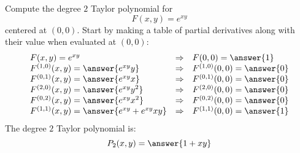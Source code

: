 \documentclass{ximera}
\author{Bart Snapp}
\begin{document}
\begin{exercise}
  Compute the degree $2$ Taylor polynomial for
  \[
  F(x,y) = e^{xy}
  \]
  centered at $(0,0)$. Start by making a table of partial
  derivatives along with their value when evaluated at $(0,0)$:
  \[
  \begin{array}{lcl}
    F(x,y) = e^{xy} & \Rightarrow &F(0,0) = \answer{1}\\
    F^{(1,0)}(x,y) = \answer{e^{xy}y} & \Rightarrow & F^{(1,0)}(0,0) = \answer{0}\\
    F^{(0,1)}(x,y) = \answer{e^{xy}x} &\Rightarrow  & F^{(0,1)}(0,0) = \answer{0}\\
    F^{(2,0)}(x,y) = \answer{e^{xy}y^2} &\Rightarrow & F^{(2,0)}(0,0) = \answer{0}\\
    F^{(0,2)}(x,y) = \answer{e^{xy}x^2} &\Rightarrow & F^{(0,2)}(0,0) = \answer{0}\\
    F^{(1,1)}(x,y) = \answer{e^{xy}+e^{xy}xy} &\Rightarrow & F^{(1,1)}(0,0) = \answer{1}
    \end{array}
    \]
    The degree $2$ Taylor polynomial is:
    \[
    P_2(x,y) =\answer{1+xy}
    \]
\end{exercise}
\end{document}
